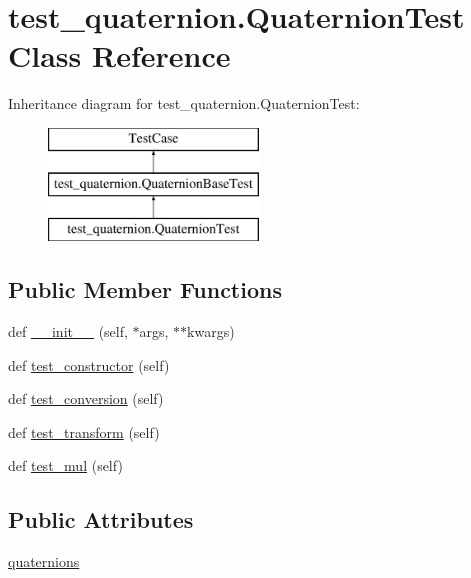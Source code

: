\hypertarget{classtest__quaternion_1_1QuaternionTest}{}\section{test\+\_\+quaternion.\+Quaternion\+Test Class Reference}
\label{classtest__quaternion_1_1QuaternionTest}
Inheritance diagram for test\+\_\+quaternion.\+Quaternion\+Test\+:\begin{figure}[H]
\begin{center}
\leavevmode
\includegraphics[height=3.000000cm]{classtest__quaternion_1_1QuaternionTest}
\end{center}
\end{figure}
\subsection*{Public Member Functions}
\begin{DoxyCompactItemize}
\item 
def \mbox{\hyperlink{classtest__quaternion_1_1QuaternionTest_a4212d313a1824e188d86a81498483219}{\+\_\+\+\_\+init\+\_\+\+\_\+}} (self, $\ast$args, $\ast$$\ast$kwargs)
\item 
def \mbox{\hyperlink{classtest__quaternion_1_1QuaternionTest_af2b57e92282ce65afff7c526d4c619ca}{test\+\_\+constructor}} (self)
\item 
def \mbox{\hyperlink{classtest__quaternion_1_1QuaternionTest_ae80f7e08845739c1d36595842c0f1424}{test\+\_\+conversion}} (self)
\item 
def \mbox{\hyperlink{classtest__quaternion_1_1QuaternionTest_a28f8557d25782bfe713fcc3772803f14}{test\+\_\+transform}} (self)
\item 
def \mbox{\hyperlink{classtest__quaternion_1_1QuaternionTest_ad4f17f223c6e6583af904198eafb7fcf}{test\+\_\+mul}} (self)
\end{DoxyCompactItemize}
\subsection*{Public Attributes}
\begin{DoxyCompactItemize}
\item 
\mbox{\hyperlink{classtest__quaternion_1_1QuaternionTest_a04389965c7de447e79c50016691ee711}{quaternions}}
\end{DoxyCompactItemize}


